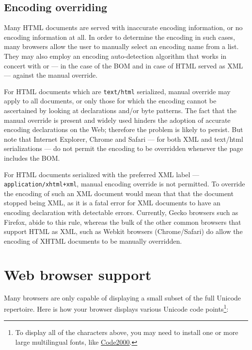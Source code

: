 \subsection{Encoding overriding}

Many HTML documents are served with inaccurate encoding information, or no encoding information at all. In order to determine the encoding in such cases, many browsers allow the user to manually select an encoding name from a list. They may also employ an encoding auto-detection algorithm that works in concert with or — in the case of the BOM and in case of HTML served as XML — against the manual override.

For HTML documents which are \texttt{text/html} serialized, manual override may apply to all documents, or only those for which the encoding cannot be ascertained by looking at declarations and/or byte patterns. The fact that the manual override is present and widely used hinders the adoption of accurate encoding declarations on the Web; therefore the problem is likely to persist. But note that Internet Explorer, Chrome and Safari — for both XML and text/html serializations — do not permit the encoding to be overridden whenever the page includes the BOM.

For HTML documents serialized with the preferred XML label — \texttt{application/xhtml+xml}, manual encoding override is not permitted. To override the encoding of such an XML document would mean that that the document stopped being XML, as it is a fatal error for XML documents to have an encoding declaration with detectable errors. Currently, Gecko browsers such as Firefox, abide to this rule, whereas the bulk of the other common browsers that support HTML as XML, such as Webkit browsers (Chrome/Safari) do allow the encoding of XHTML documents to be manually overridden.




\section{Web browser support}

Many browsers are only capable of displaying a small subset of the full Unicode repertoire. Here is how your browser displays various Unicode code points\footnote{To display all of the characters above, you may need to install one or more large multilingual fonts, like \href{http://en.wikipedia.org/wiki/Code2000}{Code2000}.}:


